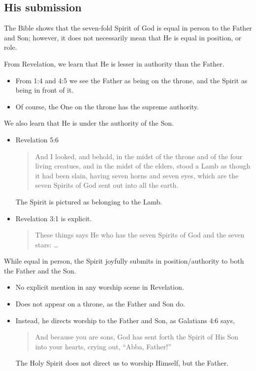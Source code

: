 \documentclass[12pt]{article}
\newcommand{\BI}{\begin{itemize}}
\newcommand{\EI}{\end{itemize}}
\newcommand{\I}{\item}
\newcommand{\Q}[1]{\begin{quote} #1 \end{quote}}
\begin{document}
\subsection{His submission}
\I  The Bible shows that the seven-fold Spirit of God is equal in person to 
    the Father and Son;
    however, it does not necessarily mean that He is equal in position, or role.
\I  From Revelation, we learn that He is lesser in authority than the Father.
\BI \I  From 1:4 and 4:5 we see the Father as being on the throne,
        and the Spirit as being in front of it.
    \I  Of course, the One on the throne has the supreme authority. \EI
\I  We also learn that He is under the authority of the Son.
\BI \I  Revelation 5:6
        \Q{ And I looked, and behold, in the midst of the throne and 
            of the four living creatues,
            and in the midst of the elders,
            stood a Lamb as though it had been slain,
            having seven horns and seven eyes,
            which are the seven Spirits of God sent out into all the earth.}
        The Spirit is pictured as belonging to the Lamb.
    \I  Revelation 3:1 is explicit.
        \Q{ These things says He who has the seven Spirits of God and 
            the seven stars: \ldots} \EI
\I  While equal in person, the Spirit joyfully submits in position/authority
    to both the Father and the Son.
\BI \I  No explicit mention in any worship scene in Revelation.
    \I  Does not appear on a throne, as the Father and Son do.
    \I  Instead, he directs worship to the Father and Son,
        as Galatians 4:6 says,
        \Q{ And because you are sons, God has sent forth the Spirit of His Son
            into your hearts, crying out, ``Abba, Father!''}
        The Holy Spirit does not direct us to worship Himself, but the Father. \EI
\end{document}
